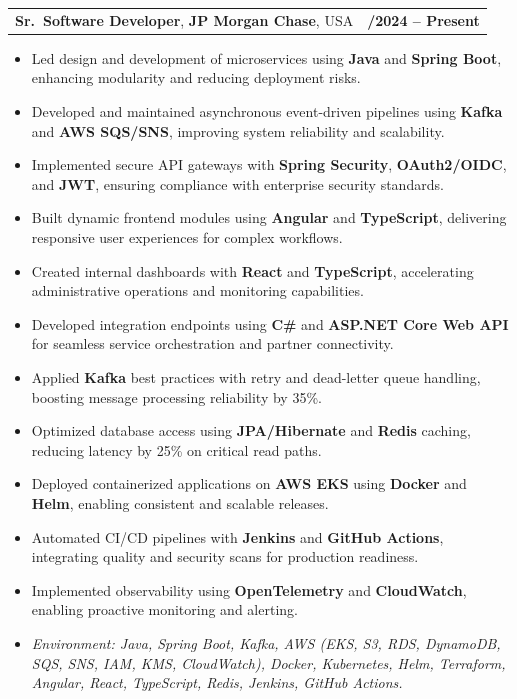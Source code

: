 \documentclass[letterpaper,11pt]{article}
\makeatletter
\newcommand{\resumeItem}[1]{
  \item\footnotesize{
    {#1 \vspace{-2pt}}
  }
}
\newcommand{\resumeSubheading}[4]{
  \vspace{-2pt}\item
    \begin{tabular*}{1.0\textwidth}[t]{l@{\extracolsep{\fill}}r}
      \textbf{\fontsize{10pt}{14pt}\selectfont #3}, \textbf{\fontsize{10pt}{14pt}\selectfont #1}, \fontsize{10pt}{14pt}\selectfont #4 & \textbf{\fontsize{10pt}{14pt}\selectfont #2} \\
    \end{tabular*}\vspace{-7pt}
}
\newcommand{\resumeItemListStart}{\begin{itemize}[leftmargin=*]}
\newcommand{\resumeItemListEnd}{\end{itemize}\vspace{-5pt}}
\makeatother
\begin{document}
\resumeSubheading
{JP Morgan Chase}{09/2024 -- Present}
{Sr.\ Software Developer}{USA}
\resumeItemListStart
  \resumeItem{Led design and development of microservices using \textbf{Java} and \textbf{Spring Boot}, enhancing modularity and reducing deployment risks.}
  \resumeItem{Developed and maintained asynchronous event-driven pipelines using \textbf{Kafka} and \textbf{AWS SQS/SNS}, improving system reliability and scalability.}
  \resumeItem{Implemented secure API gateways with \textbf{Spring Security}, \textbf{OAuth2/OIDC}, and \textbf{JWT}, ensuring compliance with enterprise security standards.}
  \resumeItem{Built dynamic frontend modules using \textbf{Angular} and \textbf{TypeScript}, delivering responsive user experiences for complex workflows.}
  \resumeItem{Created internal dashboards with \textbf{React} and \textbf{TypeScript}, accelerating administrative operations and monitoring capabilities.}
  \resumeItem{Developed integration endpoints using \textbf{C\#} and \textbf{ASP.NET Core Web API} for seamless service orchestration and partner connectivity.}
  \resumeItem{Applied \textbf{Kafka} best practices with retry and dead-letter queue handling, boosting message processing reliability by 35\%.}
  \resumeItem{Optimized database access using \textbf{JPA/Hibernate} and \textbf{Redis} caching, reducing latency by 25\% on critical read paths.}
  \resumeItem{Deployed containerized applications on \textbf{AWS EKS} using \textbf{Docker} and \textbf{Helm}, enabling consistent and scalable releases.}
  \resumeItem{Automated CI/CD pipelines with \textbf{Jenkins} and \textbf{GitHub Actions}, integrating quality and security scans for production readiness.}
  \resumeItem{Implemented observability using \textbf{OpenTelemetry} and \textbf{CloudWatch}, enabling proactive monitoring and alerting.}
  \resumeItem{\textit{Environment: Java, Spring Boot, Kafka, AWS (EKS, S3, RDS, DynamoDB, SQS, SNS, IAM, KMS, CloudWatch), Docker, Kubernetes, Helm, Terraform, Angular, React, TypeScript, Redis, Jenkins, GitHub Actions.}}
\resumeItemListEnd
\end{document}
